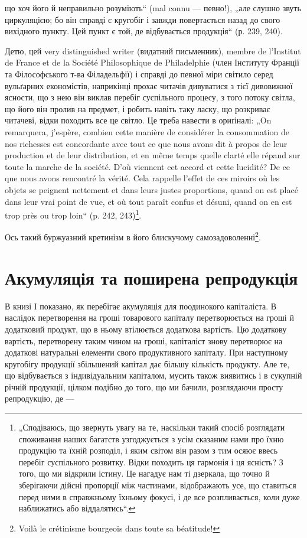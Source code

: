 \parcont{}  %
що хоч його й неправильно розуміють“ (mal connu — певно!), „але слушно звуть циркуляцією; бо він
справді є кругобіг і завжди повертається назад до свого вихідного пункту. Цей пункт є той, де
відбувається продукція“ (р. 239, 240).

Детю, цей very distinguished writer (видатний письменник), membre de l’Institut de France et de la
Société Philosophique de Philadelphie (член Інституту Франції та Філософського т-ва Філадельфії) і
справді до певної міри світило серед вульґарних економістів, наприкінці прохає читачів дивуватися з
тієї дивовижної ясности, що з нею він виклав перебіг суспільного процесу, з того потоку світла, що
його він пролив на предмет, і робить навіть таку ласку, що розкриває читачеві, відки походить все це
світло. Це треба навести в ориґіналі: „On remarquera, j’espère, combien cette manière de considérer
la consommation de nos richesses est concordante avec tout ce que nous avons dit à propos de leur
production et de leur distribution, et en même temps quelle clarté elle répand sur toute la marche
de la société. D'où viennent cet accord et cette lucidité? De ce que nous avons rencontré la vérité.
Cela rappelle l’effet de ces miroirs où les objets se peignent nettement et dans leurs justes
proportions, quand on est placé dans leur vrai point de vue, et où tout paraît confus et désuni,
quand on en est trop près ou trop loin“ (p. 242, 243)\footnote*{
„Сподіваюсь, що звернуть увагу на те, наскільки такий спосіб розглядати споживання наших багатств
узгоджується з усім сказаним нами про їхню продукцію та їхній розподіл, і яким світом він разом з
тим осяює ввесь перебіг суспільного розвитку. Відки походить ця гармонія і ця ясність? З того, що ми
відкрили істину. Це нагадує нам ті дзеркала, що точно й зберігаючи дійсні пропорції між частинами,
відображають усе, що ставиться перед ними в справжньому їхньому фокусі, і де все розпливається, коли
дуже наближатись або віддалятись“.
}.

Ось такий буржуазний кретинізм в його блискучому самозадоволенні\footnote*{
Voilà le crétinisme bourgeois dans toute sa béatitude!
}.
\label{original-380-1}

\section[Акумуляція та поширена репродукція]{Акумуляція та поширена репродукція\footnotemark{}}

\label{original-380-2}
В книзі І%
показано, як перебігає акумуляція для поодинокого капіталіста. В наслідок перетворення на
гроші товарового капіталу перетворюється на гроші й додатковий продукт, що в ньому втілюється
додаткова вартість. Цю додаткову вартість, перетворену таким чином на гроші, капіталіст знову
перетворює на додаткові натуральні елементи свого продуктивного капіталу. При наступному кругобігу
продукції збільшений капітал дає більшу кількість продукту. Але те, що відбувається з індивідуальним
капіталом, мусить також виявитись і в сукупній річній продукції, цілком подібно до того, що ми
бачили, розглядаючи просту репродукцію, де —
\parbreak{}  %
